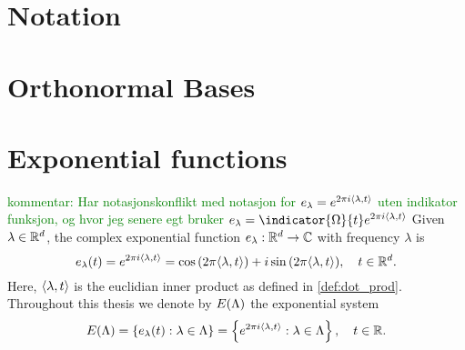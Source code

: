 \documentclass[../thesis.tex]{subfiles}
\begin{document}
\section{Notation}
    

\section{Orthonormal Bases}
    


\section{Exponential functions}
\textcolor{green}{kommentar: Har notasjonskonflikt med notasjon for $e_\lambda= e^{2 \pi i \langle \lambda, t \rangle}$ uten indikator funksjon, og hvor jeg senere egt bruker $e_\lambda=\indicator{\Omega}{t} e^{2 \pi i \inpl{t}}$}
Given $\lambda \in \mathbb{R}^d$, the complex exponential function $e_{\lambda}: \mathbb{R}^d \rightarrow \mathbb{C}$ with frequency $\lambda$ is 
\begin{equation}
    e_{\lambda}(t) = e^{2 \pi i \langle \lambda, t \rangle} = \cos{(2 \pi \langle \lambda, t \rangle)} + i \sin{(2 \pi \langle \lambda, t \rangle)}, \quad t\in \mathbb{R}^d.
\end{equation}
Here, $\langle \lambda, t \rangle$ is the euclidian inner product as defined in \cref{def:dot_prod}. Throughout this thesis we denote by $E(\Lambda)$ the exponential system
\begin{align}
    E(\Lambda) = \left\{e_\lambda(t) : \lambda \in \Lambda\right\} = \left\{e^{2\pi i \langle \lambda, t \rangle} : \lambda \in \Lambda\right\}, \quad t\in \mathbb{R}.
\end{align}
\end{document}
